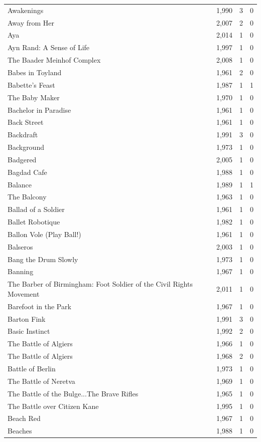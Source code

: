 \begin{tabular}{lrrr}
Awakenings & 1,990 & 3 & 0 \\
Away from Her & 2,007 & 2 & 0 \\
Aya & 2,014 & 1 & 0 \\
Ayn Rand: A Sense of Life & 1,997 & 1 & 0 \\
The Baader Meinhof Complex & 2,008 & 1 & 0 \\
Babes in Toyland & 1,961 & 2 & 0 \\
Babette's Feast & 1,987 & 1 & 1 \\
The Baby Maker & 1,970 & 1 & 0 \\
Bachelor in Paradise & 1,961 & 1 & 0 \\
Back Street & 1,961 & 1 & 0 \\
Backdraft & 1,991 & 3 & 0 \\
Background & 1,973 & 1 & 0 \\
Badgered & 2,005 & 1 & 0 \\
Bagdad Cafe & 1,988 & 1 & 0 \\
Balance & 1,989 & 1 & 1 \\
The Balcony & 1,963 & 1 & 0 \\
Ballad of a Soldier & 1,961 & 1 & 0 \\
Ballet Robotique & 1,982 & 1 & 0 \\
Ballon Vole (Play Ball!) & 1,961 & 1 & 0 \\
Balseros & 2,003 & 1 & 0 \\
Bang the Drum Slowly & 1,973 & 1 & 0 \\
Banning & 1,967 & 1 & 0 \\
The Barber of Birmingham: Foot Soldier of the Civil Rights Movement & 2,011 & 1 & 0 \\
Barefoot in the Park & 1,967 & 1 & 0 \\
Barton Fink & 1,991 & 3 & 0 \\
Basic Instinct & 1,992 & 2 & 0 \\
The Battle of Algiers & 1,966 & 1 & 0 \\
The Battle of Algiers & 1,968 & 2 & 0 \\
Battle of Berlin & 1,973 & 1 & 0 \\
The Battle of Neretva & 1,969 & 1 & 0 \\
The Battle of the Bulge...The Brave Rifles & 1,965 & 1 & 0 \\
The Battle over Citizen Kane & 1,995 & 1 & 0 \\
Beach Red & 1,967 & 1 & 0 \\
Beaches & 1,988 & 1 & 0 \\

\end{tabular}
